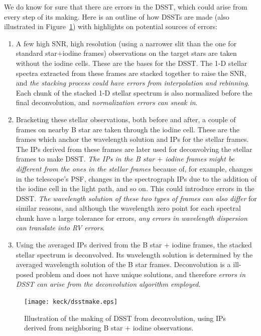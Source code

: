 We do know for sure that there are errors in the DSST, which could
arise from every step of its making. Here is an outline of how DSSTs
are made (also illustrated in Figure~\ref{keck:fig:dsstmake}) with
highlights on potential sources of errors: 
\begin{enumerate}
\item A few high SNR, high resolution (using a narrower slit than
  the one for standard star$+$iodine frames) observations on the target
  stars are taken without the iodine cells. These are the bases for the
  DSST. The 1-D stellar spectra extracted from these frames are stacked
  together to raise the SNR, and {\em the stacking process could have errors
    from interpolation and rebinning}. Each chunk of the stacked 1-D
  stellar spectrum is also normalized before the final deconvolution,
  and {\em normalization errors can sneak in}.
\item Bracketing these stellar observations, both before and after,
  a couple of frames on nearby B star are taken through the iodine
  cell. These are the frames which anchor the wavelength solution
  and IPs for the stellar frames. The IPs derived from these frames
  are later used for deconvolving the stellar frames to make
  DSST. {\em The IPs in the B star $+$ iodine frames might be different from the
    ones in the stellar frames} because of, for example, changes in the
  telescope's PSF, changes in the spectrograph IPs due to the
  addition of the iodine cell in the light path, and so on. This
  could introduce errors in the DSST. {\em The wavelength solution of
    these two types of frames can also differ} for similar reasons, and
  although the wavelength zero point for each spectral chunk have a
  large tolerance for errors, {\em any errors in wavelength dispersion
  can translate into RV errors}.
\item Using the averaged IPs derived from the B star $+$ iodine
  frames, the stacked stellar spectrum is deconvolved. Its
  wavelength solution is determined by the averaged wavelength
  solution of the B star frames. Deconvolution is a ill-posed
  problem and does not have unique solutions, and therefore {\em errors
    in DSST can arise from the deconvolution algorithm employed}. 
\end{enumerate}

\begin{figure}
\centering
\texttt{[image: keck/dsstmake.eps]}
\caption{Illustration of the making of DSST from deconvolution, using
  IPs derived from neighboring B star $+$ iodine observations.
\label{keck:fig:dsstmake}}
\end{figure}


